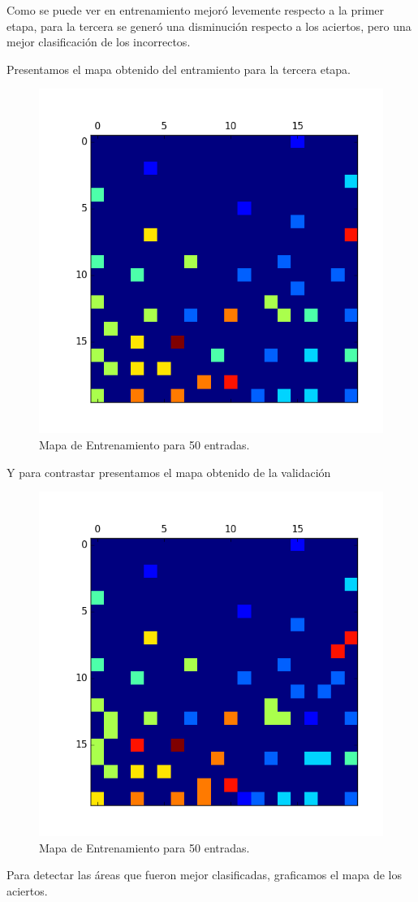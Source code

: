 Como se puede ver en entrenamiento mejoró levemente respecto a la primer etapa, para la 
tercera se generó una disminución respecto a los aciertos, pero una mejor clasificación
de los incorrectos.

Presentamos el mapa obtenido del entramiento para la tercera etapa.


\begin{figure}[H]
  \centering
  \includegraphics[width=0.5\columnwidth]{secciones/graficos/kohonen/mapaentrenamiento50.png}
  \caption{Mapa de Entrenamiento para 50 entradas.}
  \label{fig:mapa train 50}
\end{figure}

Y para contrastar presentamos el mapa obtenido de la validación

\begin{figure}[H]
  \centering
  \includegraphics[width=0.5\columnwidth]{secciones/graficos/kohonen/mapavalidacion50.png}
  \caption{Mapa de Entrenamiento para 50 entradas.}
  \label{fig:mapa train 50}
\end{figure}


Para detectar las áreas que fueron mejor clasificadas, graficamos el mapa de
los aciertos.

